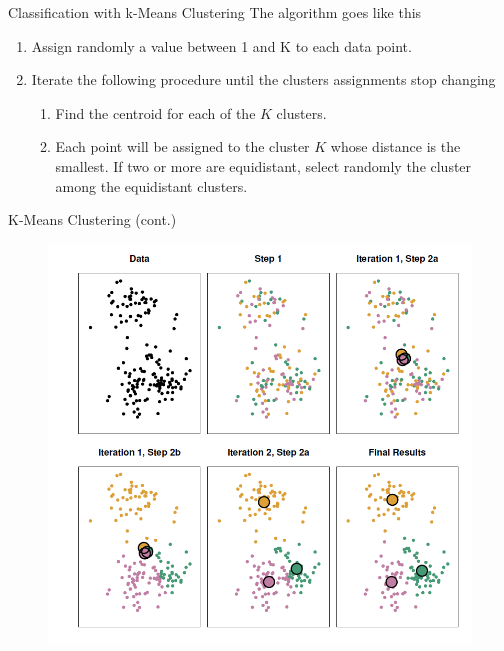 \documentclass[11pt, aspectratio=43]{beamer}
\begin{document}
\begin{frame}{Classification with k-Means Clustering}
	The algorithm goes like this
	
	\begin{enumerate}
		\item Assign randomly a value between 1 and K to each data point.
		\item Iterate the following procedure until the clusters assignments stop changing 
		\begin{enumerate}
			\item  Find the centroid for each of the $K$ clusters.
			\item Each point will be assigned to the cluster $K$ whose distance is the smallest. If two or more are equidistant, select randomly the cluster among the equidistant clusters.
		\end{enumerate}
	\end{enumerate}
	
\end{frame}

\begin{frame}{K-Means Clustering (cont.)}
 
 	\begin{figure}[h]
 	\centering
 	\includegraphics[scale=0.55]{Figures/kmeans_clustering.png}
 	\end{figure}
 
\end{frame}
\end{document}
